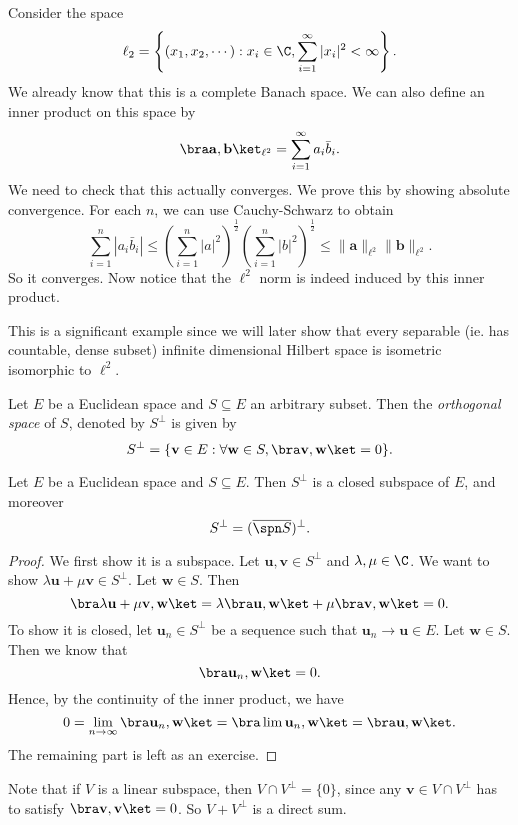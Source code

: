 \documentclass[a4paper]{article}
\begin{document}
\begin{eg}
  Consider the space
  \[
    \ell_2 = \left\{(x_1, x_2, \cdots): x_i \in \C, \sum_{i = 1}^\infty |x_i|^2 < \infty \right\}.
  \]
  We already know that this is a complete Banach space. We can also define an inner product on this space by
  \[
    \bra \mathbf{a}, \mathbf{b}\ket_{\ell^2} = \sum_{i = 1}^\infty a_i \bar{b}_i.
  \]
  We need to check that this actually converges. We prove this by showing absolute convergence. For each $n$, we can use Cauchy-Schwarz to obtain
  \[
    \sum_{i = 1}^n |a_i \bar{b}_i| \leq \left(\sum_{i = 1}^n|a|^2\right)^{\frac{1}{2}}\left(\sum_{i = 1}^n|b|^2\right)^{\frac{1}{2}} \leq \|\mathbf{a}\|_{\ell^2} \|\mathbf{b}\|_{\ell^2}.
  \]
  So it converges. Now notice that the $\ell^2$ norm is indeed induced by this inner product.
\end{eg}
This is a significant example since we will later show that every separable (ie. has countable, dense subset) infinite dimensional Hilbert space is isometric isomorphic to $\ell^2$.

\begin{defi}
  Let $E$ be a Euclidean space and $S\subseteq E$ an arbitrary subset. Then the \emph{orthogonal space} of $S$, denoted by $S^{\perp}$ is given by
  \[
    S^{\perp} = \{\mathbf{v} \in E: \forall \mathbf{w} \in S, \bra \mathbf{v}, \mathbf{w} \ket = 0\}.
  \]
\end{defi}

\begin{prop}
  Let $E$ be a Euclidean space and $S\subseteq E$. Then $S^\perp$ is a closed subspace of $E$, and moreover
  \[
    S^{\perp} = (\overline{\spn S})^{\perp}.
  \]
\end{prop}

\begin{proof}
  We first show it is a subspace. Let $\mathbf{u}, \mathbf{v} \in S^\perp$ and $\lambda, \mu \in \C$. We want to show $\lambda \mathbf{u} + \mu \mathbf{v} \in S^\perp$. Let $\mathbf{w} \in S$. Then
  \[
    \bra \lambda \mathbf{u} + \mu \mathbf{v}, \mathbf{w}\ket = \lambda \bra \mathbf{u}, \mathbf{w}\ket + \mu \bra \mathbf{v}, \mathbf{w}\ket = 0.
  \]
  To show it is closed, let $\mathbf{u}_n \in S^\perp$ be a sequence such that $\mathbf{u}_n \to \mathbf{u} \in E$. Let $\mathbf{w} \in S$. Then we know that
  \[
    \bra \mathbf{u}_n, \mathbf{w}\ket = 0.
  \]
  Hence, by the continuity of the inner product, we have
  \[
    0 = \lim_{n \to \infty} \bra \mathbf{u}_n, \mathbf{w}\ket = \bra \lim \mathbf{u}_n, \mathbf{w}\ket = \bra \mathbf{u}, \mathbf{w}\ket.
  \]
  The remaining part is left as an exercise. %
\end{proof}
Note that if $V$ is a linear subspace, then $V \cap V^\perp = \{0\}$, since any $\mathbf{v} \in V \cap V^\perp$ has to satisfy $\bra \mathbf{v}, \mathbf{v}\ket = 0$. So $V + V^\perp$ is a direct sum.
\end{document}

